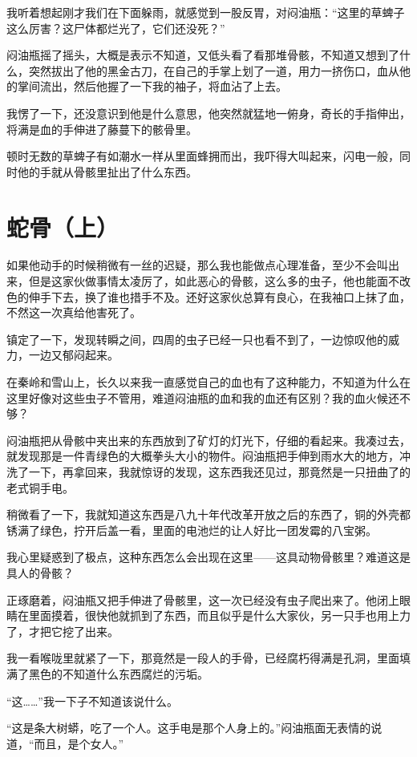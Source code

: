 我听着想起刚才我们在下面躲雨，就感觉到一股反胃，对闷油瓶：“这里的草蜱子这么厉害？这尸体都烂光了，它们还没死？”

闷油瓶摇了摇头，大概是表示不知道，又低头看了看那堆骨骸，不知道又想到了什么，突然拔出了他的黑金古刀，在自己的手掌上划了一道，用力一挤伤口，血从他的掌间流出，然后他握了一下我的袖子，将血沾了上去。

我愣了一下，还没意识到他是什么意思，他突然就猛地一俯身，奇长的手指伸出，将满是血的手伸进了藤蔓下的骸骨里。

顿时无数的草蜱子有如潮水一样从里面蜂拥而出，我吓得大叫起来，闪电一般，同时他的手就从骨骸里扯出了什么东西。

\chapter{蛇骨（上）}

如果他动手的时候稍微有一丝的迟疑，那么我也能做点心理准备，至少不会叫出来，但是这家伙做事情太凌厉了，如此恶心的骨骸，这么多的虫子，他也能面不改色的伸手下去，换了谁也措手不及。还好这家伙总算有良心，在我袖口上抹了血，不然这一次真给他害死了。

镇定了一下，发现转瞬之间，四周的虫子已经一只也看不到了，一边惊叹他的威力，一边又郁闷起来。

在秦岭和雪山上，长久以来我一直感觉自己的血也有了这种能力，不知道为什么在这里好像对这些虫子不管用，难道闷油瓶的血和我的血还有区别？我的血火候还不够？

闷油瓶把从骨骸中夹出来的东西放到了矿灯的灯光下，仔细的看起来。我凑过去，就发现那是一件青绿色的大概拳头大小的物件。闷油瓶把手伸到雨水大的地方，冲洗了一下，再拿回来，我就惊讶的发现，这东西我还见过，那竟然是一只扭曲了的老式铜手电。

稍微看了一下，我就知道这东西是八九十年代改革开放之后的东西了，铜的外壳都锈满了绿色，拧开后盖一看，里面的电池烂的让人好比一团发霉的八宝粥。

我心里疑惑到了极点，这种东西怎么会出现在这里——这具动物骨骸里？难道这是具人的骨骸？

正琢磨着，闷油瓶又把手伸进了骨骸里，这一次已经没有虫子爬出来了。他闭上眼睛在里面摸着，很快他就抓到了东西，而且似乎是什么大家伙，另一只手也用上力了，才把它挖了出来。

我一看喉咙里就紧了一下，那竟然是一段人的手骨，已经腐朽得满是孔洞，里面填满了黑色的不知道什么东西腐烂的污垢。

“这……”我一下子不知道该说什么。

“这是条大树蟒，吃了一个人。这手电是那个人身上的。”闷油瓶面无表情的说道，“而且，是个女人。”

